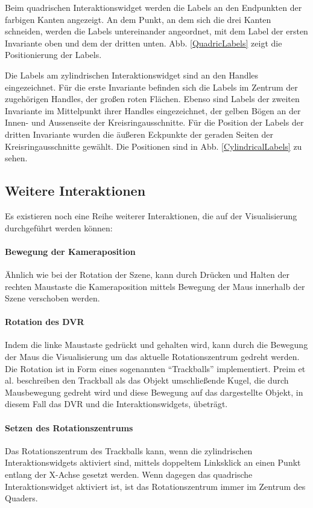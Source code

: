 \documentclass[a4paper,fontsize=12pt,toc=bib,halfparskip]{scrartcl}
\begin{document}
Beim quadrischen Interaktionswidget werden die Labels an den Endpunkten der farbigen Kanten angezeigt. An dem Punkt, an dem sich die drei Kanten schneiden, werden die Labels untereinander angeordnet, mit dem Label der ersten Invariante oben und dem der dritten unten. Abb. \ref{QuadricLabels} zeigt die Positionierung der Labels.

Die Labels am zylindrischen Interaktionswidget sind an den Handles eingezeichnet. F\"ur die erste Invariante befinden sich die Labels im Zentrum der zugeh\"origen Handles, der gro{\ss}en roten Fl\"achen. Ebenso sind Labels der zweiten Invariante im Mittelpunkt ihrer Handles eingezeichnet, der gelben B\"ogen an der Innen- und Aussenseite der Kreisringausschnitte. F\"ur die Position der Labels der dritten Invariante wurden die \"au{\ss}eren Eckpunkte der geraden Seiten der Kreisringausschnitte gew\"ahlt. Die Positionen sind in Abb. \ref{CylindricalLabels} zu sehen.

\subsection{Weitere Interaktionen}
Es existieren noch eine Reihe weiterer Interaktionen, die auf der Visualisierung durchgef\"uhrt werden k\"onnen:
\paragraph{Bewegung der Kameraposition}
\"Ahnlich wie bei der Rotation der Szene, kann durch Dr\"ucken und Halten der rechten Maustaste die Kameraposition mittels Bewegung der Maus innerhalb der Szene verschoben werden.
\paragraph{Rotation des DVR}
Indem die linke Maustaste gedr\"uckt und gehalten wird, kann durch die Bewegung der Maus die Visualisierung um das aktuelle Rotationszentrum gedreht werden. Die Rotation ist in Form eines sogenannten ``Trackballs'' implementiert. Preim et al. beschreiben den Trackball als das Objekt umschlie{\ss}ende Kugel, die durch Mausbewegung gedreht wird und diese Bewegung auf das dargestellte Objekt, in diesem Fall das DVR und die Interaktionswidgets, \"ubetr\"agt.
\paragraph{Setzen des Rotationszentrums}
Das Rotationszentrum des Trackballs kann, wenn die zylindrischen Interaktionswidgets aktiviert sind, mittels doppeltem Linksklick an einen Punkt entlang der X-Achse gesetzt werden. Wenn dagegen das quadrische Interaktionswidget aktiviert ist, ist das Rotationszentrum immer im Zentrum des Quaders.
\end{document}

